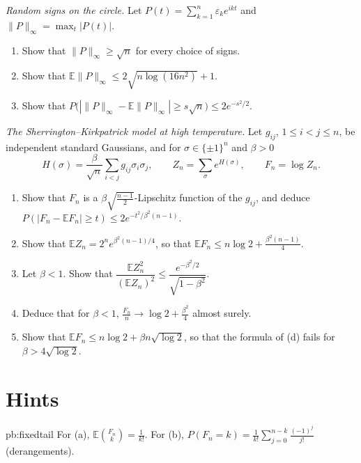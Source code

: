 \begin{exercise}[$\star\star$]\label{pb:salemzygmund}
\emph{Random signs on the circle.} Let $P(t)=\sum_{k=1}^n\varepsilon_ke^{ikt}$ and $\|P\|_\infty=\max_t|P(t)|$.
\begin{enumerate}[label=(\alph*)]
\item Show that $\|P\|_\infty\ge\sqrt n$ for every choice of signs.
\item Show that $\mathbb E\|P\|_\infty\le2\sqrt{n\log(16n^2)}+1$.
\item Show that $P\bigl(|\|P\|_\infty-\mathbb E\|P\|_\infty|\ge s\sqrt n\bigr)\le2e^{-s^2/2}$.
\end{enumerate}
\end{exercise}

\begin{exercise}\label{pb:skconc}
\emph{The Sherrington--Kirkpatrick model at high temperature.} Let $g_{ij}$, $1\le i<j\le n$, be independent standard Gaussians, and for $\sigma\in\{\pm1\}^n$ and $\beta>0$
\[
H(\sigma)=\frac\beta{\sqrt n}\sum_{i<j}g_{ij}\sigma_i\sigma_j,\qquad Z_n=\sum_\sigma e^{H(\sigma)},\qquad F_n=\log Z_n.
\]
\begin{enumerate}[label=(\alph*)]
\item Show that $F_n$ is a $\beta\sqrt{\frac{n-1}2}$-Lipschitz function of the $g_{ij}$, and deduce $P(|F_n-\mathbb EF_n|\ge t)\le2e^{-t^2/\beta^2(n-1)}$.
\item Show that $\mathbb EZ_n=2^ne^{\beta^2(n-1)/4}$, so that $\mathbb EF_n\le n\log2+\frac{\beta^2(n-1)}4$.
\item Let $\beta<1$. Show that $\dfrac{\mathbb EZ_n^2}{(\mathbb EZ_n)^2}\le\dfrac{e^{-\beta^2/2}}{\sqrt{1-\beta^2}}$.
\item Deduce that for $\beta<1$, $\frac{F_n}n\to\log2+\frac{\beta^2}4$ almost surely.
\item Show that $\mathbb EF_n\le n\log2+\beta n\sqrt{\log2}$, so that the formula of (d) fails for $\beta>4\sqrt{\log2}$.
\end{enumerate}
\end{exercise}

\section*{Hints}

\begin{hint}{pb:fixedtail}
For (a), $\mathbb E\binom{F_n}k=\frac1{k!}$. For (b), $P(F_n=k)=\frac1{k!}\sum_{j=0}^{n-k}\frac{(-1)^j}{j!}$ (derangements).
\end{hint}

